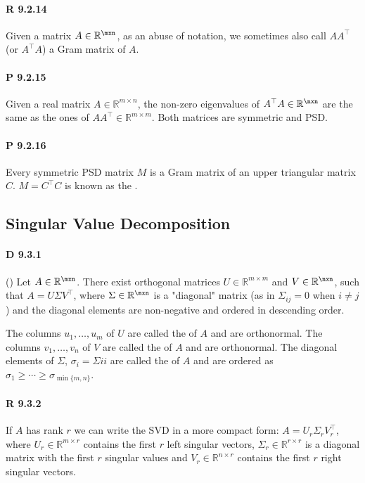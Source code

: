 \paragraph{R 9.2.14} Given a matrix $A\in\mathbb{R}^{\mxn}$, as an
abuse of notation, we sometimes also call $AA^\top$ (or $A^\top A$) a Gram
matrix of $A$.

\paragraph{P 9.2.15} Given a real matrix $A\in\mathbb{R}^{m\times
n}$, the non-zero eigenvalues of $A^\top A\in\mathbb{R}^ {\nxn}$ are the
same as the ones of $AA^\top\in\mathbb{R}^{m\times m}$. Both matrices are
symmetric and PSD.

\paragraph{P 9.2.16} Every symmetric PSD matrix $M$
is a Gram matrix of an upper triangular matrix $C$. $M=C^\top C$ is known as
the .

\subsection{Singular Value Decomposition}

\paragraph{D 9.3.1} ()
Let $A\in\mathbb{R}^{\mxn}$. There exist orthogonal matrices
$U\in\mathbb{R}^{m\times m}$ and $V\in\mathbb{R}^{\nxn}$, such
that $A=U\Sigma V^\top$, where $\Sigma\in\mathbb{R}^{\mxn}$ is a
"diagonal" matrix (as in $\Sigma_{ij} = 0$ when $i\ne j$) and the
diagonal elements are non-negative and ordered in descending order.

The columns $u_1,\dots,u_m$ of $U$ are called the  of $A$ and are orthonormal. The columns
$v_1,\dots,v_n$ of $V$ are called the 
of $A$ and are orthonormal. The diagonal elements of $\Sigma$,
$\sigma_{i}=\Sigma{ii}$ are called the  of $A$ and are
ordered as $\sigma_1\geq\cdots\geq\sigma_{\min\{m,n\}}$.

\paragraph{R 9.3.2} If $A$ has rank $r$ we can write the SVD in a more
compact form: $A=U_r\Sigma_rV_r^\top$, where $U_r\in\mathbb{R}^{m\times r}$
contains the first $r$ left singular vectors,
$\Sigma_r\in\mathbb{R}^{r\times r}$ is a diagonal matrix with the first $r$
singular values and $V_r\in\mathbb{R}^{n\times r}$ contains the
first $r$ right singular vectors.

